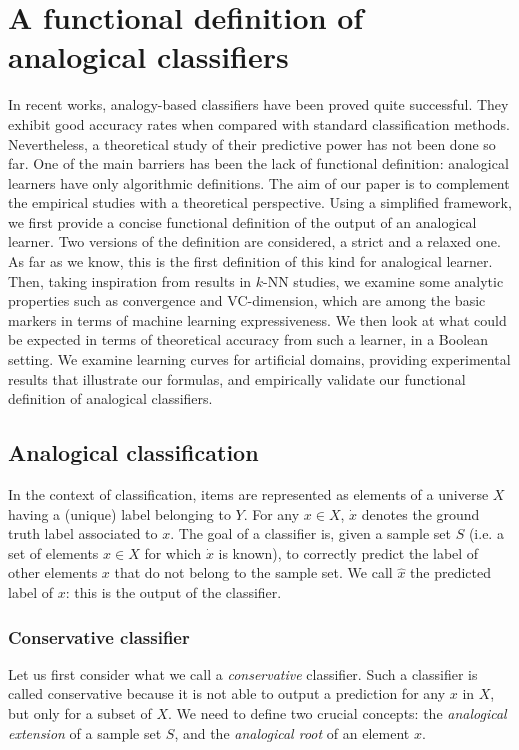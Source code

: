 \chapter{A functional definition of analogical classifiers}
In recent works, analogy-based classifiers have been proved quite successful.
They exhibit good accuracy rates when compared with standard classification
methods. Nevertheless, a theoretical study of their predictive power has not
been done so far. One of the main barriers has been the lack of functional
definition: analogical learners have only algorithmic definitions.  The aim of
our paper is to complement the empirical studies with a theoretical
perspective. Using a simplified framework, we first provide a concise
functional definition of the output of an analogical learner.  Two versions of
the definition are considered, a strict and a relaxed one.  As far as we know,
this is the first definition of this kind for analogical learner. Then, taking
inspiration from results in $k$-NN studies, we examine some analytic
properties such as convergence and VC-dimension, which are among the basic
markers in terms of machine learning expressiveness. We then look at what could
be expected in terms of theoretical accuracy from such a learner, in a Boolean
setting.  We examine learning curves for artificial domains, providing
experimental results that illustrate our formulas, and empirically validate our
functional definition of analogical classifiers.

\section{Analogical classification}
\label{ANALOGICAL_CLASSIFICATION}
In the context of  classification, items are represented as elements of a universe $X$ having a (unique) label belonging
to $Y$. For any $x\in X$, $\dot{x}$ denotes the ground
truth label associated to $x$. The goal of a classifier is, given a sample
set $S$ (i.e. a set of elements $x \in X$ for which $\dot{x}$ is known), to
correctly predict the label of other elements $x$ that do not belong to the
sample set. We call $\hat{x}$ the predicted label of $x$: this is the output of the classifier.

\subsection{Conservative classifier}
\label{conservative}

Let us first consider what we call a \textit{conservative}
classifier. Such a classifier is called conservative because it
is not able to output a prediction for any $x$ in $X$, but only for a subset of
$X$. We need to define two crucial concepts: the \textit{analogical extension} of
a sample set $S$, and the \textit{analogical root} of an element $x$.

